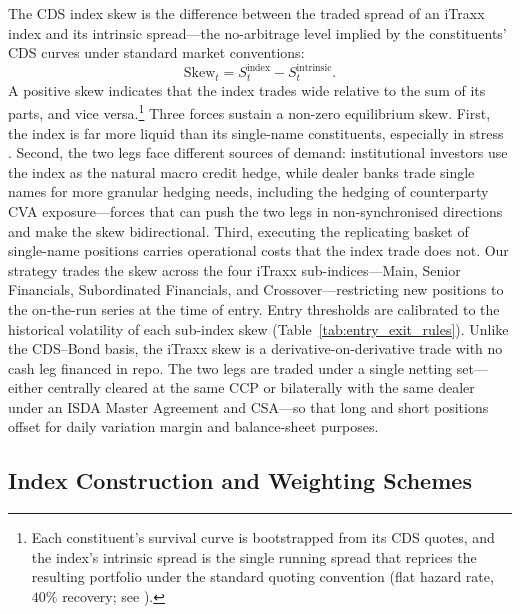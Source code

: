 The CDS index skew is the difference between the traded spread of an
iTraxx index and its intrinsic spread---the no-arbitrage level implied
by the constituents' CDS curves under standard market conventions:
\begin{equation}
  \mathrm{Skew}_t = S_t^{\text{index}} - S_t^{\text{intrinsic}}.
\label{eq:skew}
\end{equation}
A positive skew indicates that the index trades wide relative to the
sum of its parts, and vice versa.\footnote{Each constituent's survival
curve is bootstrapped from its CDS quotes, and the index's intrinsic
spread is the single running spread that reprices the resulting
portfolio under the standard quoting convention (flat hazard rate,
$40\%$ recovery; see \citealp{o2008modelling}).} Three forces sustain
a non-zero equilibrium skew. First, the index is far more liquid than
its single-name constituents, especially in stress
\citep{junge2015liquidity}. Second, the two legs face different
sources of demand: institutional investors use the index as the
natural macro credit hedge, while dealer banks trade single names for
more granular hedging needs, including the hedging of counterparty CVA
exposure---forces that can push the two legs in non-synchronised
directions and make the skew bidirectional. Third, executing the
replicating basket of single-name positions carries operational costs
that the index trade does not. Our strategy trades the skew across the
four iTraxx sub-indices---Main, Senior Financials, Subordinated
Financials, and Crossover---restricting new positions to the
on-the-run series at the time of entry. Entry thresholds are
calibrated to the historical volatility of each sub-index skew
(Table~\ref{tab:entry_exit_rules}). Unlike the CDS--Bond basis, the
iTraxx skew is a derivative-on-derivative trade with no cash leg
financed in repo. The two legs are traded under a single netting
set---either centrally cleared at the same CCP or bilaterally with the
same dealer under an ISDA Master Agreement and CSA---so that long and
short positions offset for daily variation margin and balance-sheet
purposes.



\subsection{Index Construction and Weighting Schemes}
\label{sec:index_construction}


